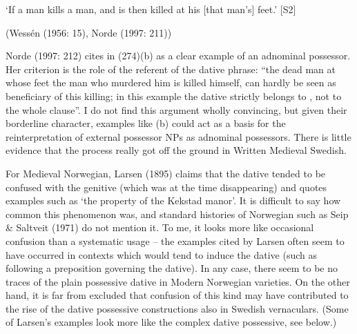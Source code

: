 ‘If a man kills a man, and is then killed at his [that man’s] feet.’ [S2]
\z

(Wessén (1956: 15), Norde (1997: 211))

Norde (1997: 212) cites in (274)(b) as a clear example of an adnominal possessor. Her criterion is the role of the referent of the dative phrase: “the dead man at whose feet the man who murdered him is killed himself, can hardly be seen as beneficiary of this killing; in this example the dative  strictly belongs to , not to the whole clause”. I do not find this argument wholly convincing, but given their borderline character, examples like (b) could act as a basis for the reinterpretation of external possessor NPs as adnominal possessors. There is little evidence that the process really got off the ground in Written Medieval Swedish.

For Medieval Norwegian, Larsen (1895) claims that the dative tended to be confused with the genitive (which was at the time disappearing) and quotes examples such as  ‘the property of the Kekstad manor’. It is difficult to say how common this phenomenon was, and standard histories of Norwegian such as Seip \& Saltveit (1971) do not mention it. To me, it looks more like occasional confusion than a systematic usage – the examples cited by Larsen often seem to have occurred in contexts which would tend to induce the dative (such as following a preposition governing the dative). In any case, there seem to be no traces of the plain possessive dative in Modern Norwegian varieties. On the other hand, it is far from excluded that confusion of this kind may have contributed to the rise of the dative possessive constructions also in Swedish vernaculars. (Some of Larsen’s examples look more like the complex dative possessive, see below.)

\clearpage%


